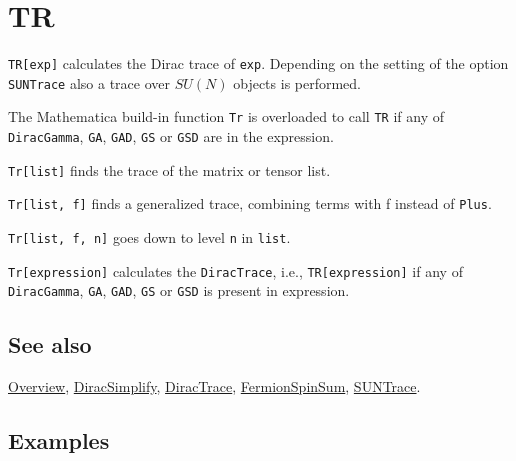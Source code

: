 \documentclass[../FeynCalcManual.tex]{subfiles}
\begin{document}
\hypertarget{tr}{%
\section{TR}\label{tr}}

\texttt{TR[\allowbreak{}exp]} calculates the Dirac trace of
\texttt{exp}. Depending on the setting of the option \texttt{SUNTrace}
also a trace over \(SU(N)\) objects is performed.

The Mathematica build-in function \texttt{Tr} is overloaded to call
\texttt{TR} if any of \texttt{DiracGamma}, \texttt{GA}, \texttt{GAD},
\texttt{GS} or \texttt{GSD} are in the expression.

\texttt{Tr[\allowbreak{}list]} finds the trace of the matrix or tensor
list.

\texttt{Tr[\allowbreak{}list,\ \allowbreak{}f]} finds a generalized
trace, combining terms with f instead of \texttt{Plus}.

\texttt{Tr[\allowbreak{}list,\ \allowbreak{}f,\ \allowbreak{}n]} goes
down to level \texttt{n} in \texttt{list}.

\texttt{Tr[\allowbreak{}expression]} calculates the \texttt{DiracTrace},
i.e., \texttt{TR[\allowbreak{}expression]} if any of
\texttt{DiracGamma}, \texttt{GA}, \texttt{GAD}, \texttt{GS} or
\texttt{GSD} is present in expression.

\subsection{See also}

\hyperlink{toc}{Overview}, \hyperlink{diracsimplify}{DiracSimplify},
\hyperlink{diractrace}{DiracTrace},
\hyperlink{fermionspinsum}{FermionSpinSum},
\hyperlink{suntrace}{SUNTrace}.

\subsection{Examples}

\begin{Shaded}
\begin{Highlighting}[]
\OperatorTok{[}\SpecialCharTok{\textbackslash{}}\OperatorTok{[}\OperatorTok{],} \SpecialCharTok{\textbackslash{}}\OperatorTok{[}\OperatorTok{]]} 
 
\OperatorTok{[}\SpecialCharTok{\%}\OperatorTok{]}
\end{Highlighting}
\end{Shaded}
\end{document}

